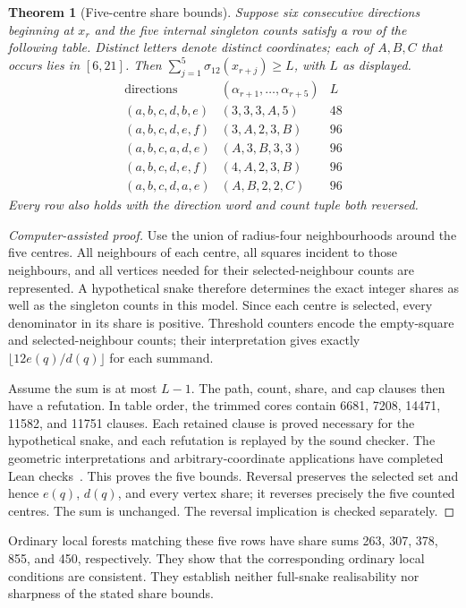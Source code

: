 \documentclass[11pt,a4paper]{article}
\newtheorem{theorem}{Theorem}[section]
\theoremstyle{definition}
\theoremstyle{remark}
\begin{document}
\begin{theorem}[Five-centre share bounds]\label{thm:five-shares}
Suppose six consecutive directions beginning at $x_r$ and the five internal singleton counts satisfy a row of the following table. Distinct letters denote distinct coordinates; each of $A,B,C$ that occurs lies in $[6,21]$. Then $\sum_{j=1}^{5}\sigma_{12}(x_{r+j})\ge L$, with $L$ as displayed.
\[
\begin{array}{c|c|r}
\text{directions}&(\alpha_{r+1},\ldots,\alpha_{r+5})&L\\\hline
(a,b,c,d,b,e)&(3,3,3,A,5)&48\\
(a,b,c,d,e,f)&(3,A,2,3,B)&96\\
(a,b,c,a,d,e)&(A,3,B,3,3)&96\\
(a,b,c,d,e,f)&(4,A,2,3,B)&96\\
(a,b,c,d,a,e)&(A,B,2,2,C)&96
\end{array}
\]
Every row also holds with the direction word and count tuple both reversed.
\end{theorem}
\begin{proof}[Computer-assisted proof]
Use the union of radius-four neighbourhoods around the five centres. All neighbours of each centre, all squares incident to those neighbours, and all vertices needed for their selected-neighbour counts are represented. A hypothetical snake therefore determines the exact integer shares as well as the singleton counts in this model. Since each centre is selected, every denominator in its share is positive. Threshold counters encode the empty-square and selected-neighbour counts; their interpretation gives exactly $\lfloor12e(q)/d(q)\rfloor$ for each summand.

Assume the sum is at most $L-1$. The path, count, share, and cap clauses then have a refutation. In table order, the trimmed cores contain 6681, 7208, 14471, 11582, and 11751 clauses. Each retained clause is proved necessary for the hypothetical snake, and each refutation is replayed by the sound checker. The geometric interpretations and arbitrary-coordinate applications have completed Lean checks~\cite{recentarchive}. This proves the five bounds. Reversal preserves the selected set and hence $e(q)$, $d(q)$, and every vertex share; it reverses precisely the five counted centres. The sum is unchanged. The reversal implication is checked separately.
\end{proof}
Ordinary local forests matching these five rows have share sums 263, 307, 378, 855, and 450, respectively. They show that the corresponding ordinary local conditions are consistent. They establish neither full-snake realisability nor sharpness of the stated share bounds.
\end{document}
